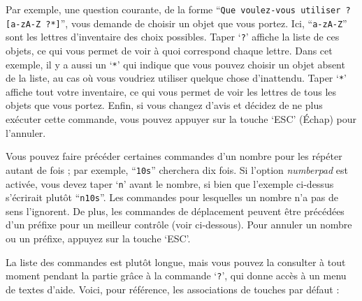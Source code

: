 \documentclass[titlepage]{article}
\begin{document}
Par exemple, une question courante, de la forme ``\texttt{Que voulez-vous
utiliser ? [a-zA-Z\ ?*]}'', vous demande de choisir un objet que vous portez.
Ici, ``\texttt{a-zA-Z}'' sont les lettres d'inventaire des choix possibles.
Taper `\texttt{?}' affiche la liste de ces objets, ce qui vous permet de voir
à quoi correspond chaque lettre.  Dans cet exemple, il y a aussi un `\texttt{*}'
qui indique que vous pouvez choisir un objet absent de la liste, au cas où
vous voudriez utiliser quelque chose d'inattendu.  Taper `\texttt{*}' affiche tout votre
inventaire, ce qui vous permet de voir les lettres de tous les objets que
vous portez.  Enfin, si vous changez d'avis et décidez de ne plus exécuter
cette commande, vous pouvez appuyer sur la touche `ESC' (Échap) pour
l'annuler.

Vous pouvez faire précéder certaines commandes d'un nombre pour les répéter
autant de fois ; par exemple, ``\texttt{10s}'' cherchera dix fois.  Si l'option
\textit{number\textunderscore pad}
est activée, vous devez taper `\texttt{n}' avant le nombre, si bien que l'exemple
ci-dessus s'écrirait plutôt ``\texttt{n10s}''.  Les commandes pour lesquelles un nombre
n'a pas de sens l'ignorent.  De plus, les commandes de déplacement peuvent être
précédées d'un préfixe pour un meilleur contrôle (voir ci-dessous).  Pour annuler
un nombre ou un préfixe, appuyez sur la touche
`ESC'.

La liste des commandes est plutôt longue, mais vous pouvez la consulter à
tout moment pendant la partie grâce à la commande `\texttt{?}', qui donne accès
à un menu de textes d'aide.  Voici, pour référence, les associations de touches par défaut :
\end{document}
